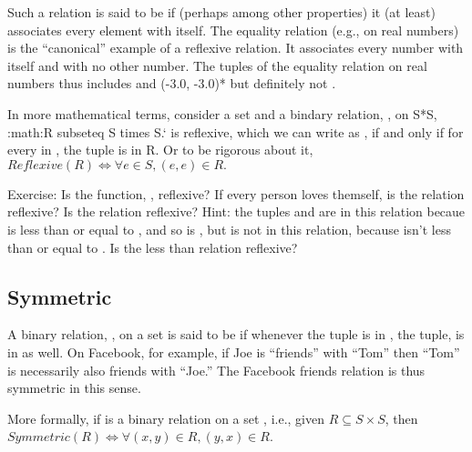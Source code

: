 \documentclass[letterpaper,10pt,english]{sphinxmanual}
\begin{document}
Such a relation is said to be  if (perhaps among other
properties) it (at least) associates every element with itself.  The
equality relation (e.g., on real numbers) is the “canonical” example
of a reflexive relation. It associates every number with itself and
with no other number. The tuples of the equality relation on real
numbers thus includes  and (-3.0, -3.0)* but definitely
not .

In more mathematical terms, consider a set  and a bindary relation,
, on S*S, :math:R subseteq S times S.{}`  is reflexive, which we
can write as , if and only if for every  in , the
tuple  is in R. Or to be rigorous about it, \(Reflexive(R)
\iff \forall e \in S, (e,e) \in R.\)

Exercise: Is the function, , reflexive? If every person loves
themself, is the  relation reflexive? Is the  relation reflexive? Hint: the tuples  and  are
in this relation becaue  is less than or equal to , and so is
, but  is not in this relation, because  isn’t less than
or equal to . Is the less than relation reflexive?


\subsection{Symmetric}
\label{\detokenize{07-set-theory:symmetric}}
A binary relation, , on a set  is said to be  if
whenever the tuple  is in , the tuple,  is in  as
well. On Facebook, for example, if Joe is “friends” with “Tom” then
“Tom” is necessarily also friends with “Joe.” The Facebook friends
relation is thus symmetric in this sense.

More formally, if  is a binary relation on a set , i.e., given
\(R \subseteq S \times S\), then \(Symmetric(R) \iff \forall
(x,y) \in R, (y,x) \in R\).
\end{document}
